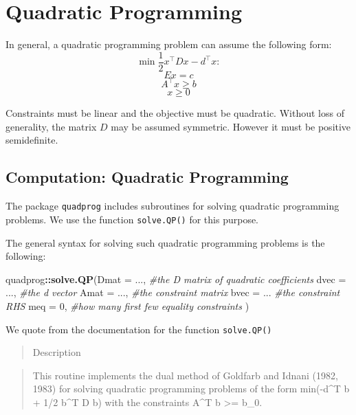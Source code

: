 \documentclass[11pt,]{article}
\newenvironment{Shaded}{\begin{snugshade}}{\end{snugshade}}
\newcommand{\KeywordTok}[1]{\textcolor[rgb]{0.13,0.29,0.53}{\textbf{#1}}}
\newcommand{\DataTypeTok}[1]{\textcolor[rgb]{0.13,0.29,0.53}{#1}}
\newcommand{\DecValTok}[1]{\textcolor[rgb]{0.00,0.00,0.81}{#1}}
\newcommand{\CommentTok}[1]{\textcolor[rgb]{0.56,0.35,0.01}{\textit{#1}}}
\newcommand{\OperatorTok}[1]{\textcolor[rgb]{0.81,0.36,0.00}{\textbf{#1}}}
\newcommand{\NormalTok}[1]{#1}
\begin{document}
\section{Quadratic Programming}\label{quadratic-programming}

In general, a quadratic programming problem can assume the following
form: \[\min{} \frac{1}{2}x^{\top}Dx-d^{\top}x:\] \[Ex = c\]
\[A^{\top}x\geq b\] \[x\geq 0\]

Constraints must be linear and the objective must be quadratic. Without
loss of generality, the matrix \(D\) may be assumed symmetric. However
it must be positive semidefinite.

\subsection{Computation: Quadratic
Programming}\label{computation-quadratic-programming}

The package \texttt{quadprog} includes subroutines for solving quadratic
programming problems. We use the function \texttt{solve.QP()} for this
purpose.

The general syntax for solving such quadratic programming problems is
the following:

\begin{Shaded}
\begin{Highlighting}[]
\NormalTok{quadprog}\OperatorTok{::}\KeywordTok{solve.QP}\NormalTok{(}\DataTypeTok{Dmat =}\NormalTok{ ..., }\CommentTok{#the D matrix of quadratic coefficients}
                   \DataTypeTok{dvec =}\NormalTok{ ..., }\CommentTok{#the d vector}
                   \DataTypeTok{Amat =}\NormalTok{ ..., }\CommentTok{#the constraint matrix}
                   \DataTypeTok{bvec =}\NormalTok{ ... }\CommentTok{#the constraint RHS}
                   \DataTypeTok{meq =} \DecValTok{0}\NormalTok{, }\CommentTok{#how many first few equality constraints}
\NormalTok{                  )}
\end{Highlighting}
\end{Shaded}

We quote from the documentation for the function \texttt{solve.QP()}

\begin{quote}
Description
\end{quote}

\begin{quote}
This routine implements the dual method of Goldfarb and Idnani (1982,
1983) for solving quadratic programming problems of the form min(-d\^{}T
b + 1/2 b\^{}T D b) with the constraints A\^{}T b \textgreater{}= b\_0.
\end{quote}
\end{document}
